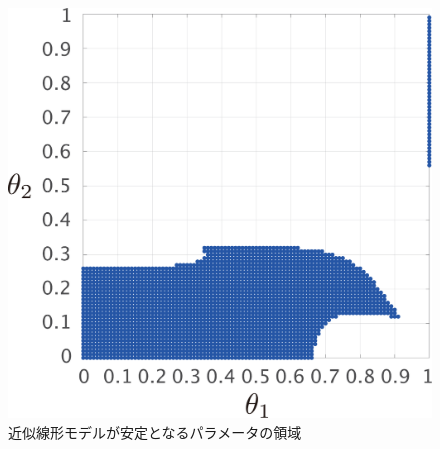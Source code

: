 \documentclass[tombow,dvipdfmx]{corona-a5}
\begin{document}
\begin{figure}[t]
{\begin{minipage}{0.32\linewidth}
  \end{minipage}
  \begin{minipage}{0.32\linewidth}
    \centering
    \includegraphics[width = .85\linewidth]{figs/gam5}
  \end{minipage}
  \caption{近似線形モデルが安定となるパラメータの領域}
  \label{fig:gamsta}
  }
\end{figure}
\end{document}
